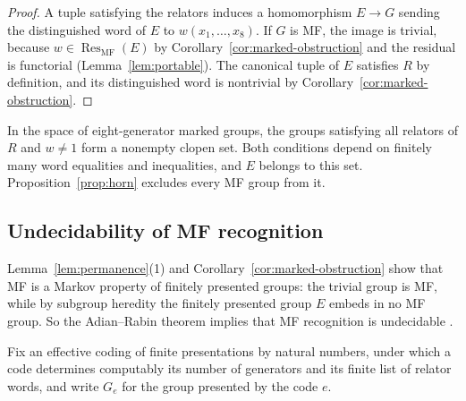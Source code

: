 \documentclass[11pt]{amsart}
\newcommand{\leanverified}[2]{\ignorespaces}
\theoremstyle{definition}
\theoremstyle{remark}
\theoremstyle{plain}
\begin{document}
\begin{proof}
A tuple satisfying the relators induces a homomorphism $E\to G$ sending
the distinguished word of $E$ to $w(x_1,\dots,x_8)$.  If $G$ is MF,
the image is trivial, because
$w\in\operatorname{Res}_{\mathrm{MF}}(E)$ by Corollary~\ref{cor:marked-obstruction} and
the residual is functorial (Lemma~\ref{lem:portable}).
The canonical tuple of $E$ satisfies $R$ by definition, and its
distinguished word is nontrivial by Corollary~\ref{cor:marked-obstruction}.
\end{proof}

In the space of eight-generator marked groups, the groups satisfying
all relators of $R$ and $w\ne1$ form a nonempty clopen set.  Both
conditions depend on finitely many word equalities and inequalities,
and $E$ belongs to this set.  Proposition~\ref{prop:horn} excludes every
MF group from it.
\leanverified{Sofic/LiteralMarkedCylinder}{GroupApproximation.LiteralMarkedCylinder.literal_nonempty_clopen_nonMF_cylinder}

\subsection{Undecidability of MF recognition}

Lemma~\ref{lem:permanence}(1) and Corollary~\ref{cor:marked-obstruction} show that MF is
a Markov property of finitely presented groups: the trivial group is
MF, while by subgroup heredity the finitely presented group $E$
embeds in no MF group.  So the Adian--Rabin theorem implies
that MF recognition is undecidable \cite{Rabin58}.

Fix an effective coding of finite presentations by natural numbers,
under which a code determines computably its number of generators and
its finite list of relator words, and write $G_e$ for the group
presented by the code $e$.
\end{document}
